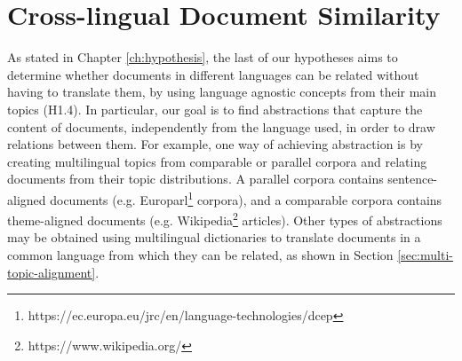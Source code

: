 

\chapter{Cross-lingual Document Similarity}\label{ch:multilinguality}

\graphicspath{{multilinguality/figures/}}



As stated in Chapter \ref{ch:hypothesis}, the last of our hypotheses aims to determine whether documents in different languages can be related without having to translate them, by using language agnostic concepts from their main topics (H1.4). In particular, our goal is to find abstractions that capture the content of documents, independently from the language used, in order to draw relations between them. For example, one way of achieving abstraction is by creating multilingual topics from comparable or parallel corpora and relating documents from their topic distributions. A parallel corpora contains sentence-aligned documents (e.g. Europarl\footnote{https://ec.europa.eu/jrc/en/language-technologies/dcep} corpora), and a comparable corpora contains theme-aligned documents (e.g. Wikipedia\footnote{https://www.wikipedia.org/} articles). Other types of abstractions may be obtained using multilingual dictionaries to translate documents in a common language from which they can be related, as shown in Section \ref{sec:multi-topic-alignment}. 

